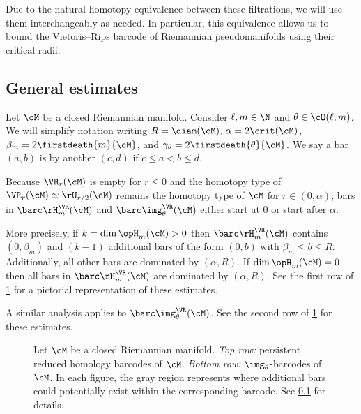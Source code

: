 \medskip Due to the natural homotopy equivalence between these filtrations, we will use them interchangeably as needed.
In particular, this equivalence allows us to bound the Vietoris--Rips barcode of Riemannian pseudomanifolds using their critical radii.

\subsection{General estimates}\label{ss:barcode_general}

Let \(\cM\) be a closed Riemannian manifold.
Consider \(\ell, m \in \N\) and \(\theta \in \cO(\ell,m)\).
We will simplify notation writing \(R = \diam(\cM),\, \alpha = 2\crit(\cM)\), \(\beta_m = 2\firstdeath{m}{\cM}\), and \(\gamma_\theta = 2\firstdeath{\theta}{\cM}\).
We say a bar $(a, b)$ is  by another $(c,d)$ if $c \leq a < b \leq d$.

Because $\VR_r(\cM)$ is empty for \(r \leq 0\) and the homotopy type of $\VR_r(\cM)\simeq \rU_{r/2}(\cM)$ remains the homotopy type of $\cM$ for $r \in (0, \alpha)$, bars in \(\barc \rH_m^{\VR}(\cM)\) and $\barc\img_\theta^{\VR}(\cM)$ either start at $0$ or start after $\alpha$.

More precisely, if \(k = \dim \opH_m(\cM) > 0\) then $\barc\rH_m^{\VR}(\cM)$ contains $(0, \beta_m)$ and \((k - 1)\) additional bars of the form \((0, b)\) with \(\beta_m \leq b \leq R\).
Additionally, all other bars are dominated by \((\alpha, R)\).
If \(\dim \opH_m(\cM) = 0\) then all bars in \(\barc\rH_m^{\VR}(\cM)\) are dominated by \((\alpha, R)\).
See the first row of \cref{fig:barcodes_general} for a pictorial representation of these estimates.

A similar analysis applies to $\barc\img_\theta^{\VR}(\cM)$.
See the second row of \cref{fig:barcodes_general} for these estimates.

\begin{figure}
	\centering
	
	\caption{Let $\cM$ be a closed Riemannian manifold.
		\emph{Top row:} persistent reduced homology barcodes of $\cM$.
		\emph{Bottom row:} $\img_\theta$-barcodes of $\cM$.
		In each figure, the gray region represents where additional bars could potentially exist within the corresponding barcode.
		See \cref{ss:barcode_general} for details.}
	\label{fig:barcodes_general}
\end{figure}